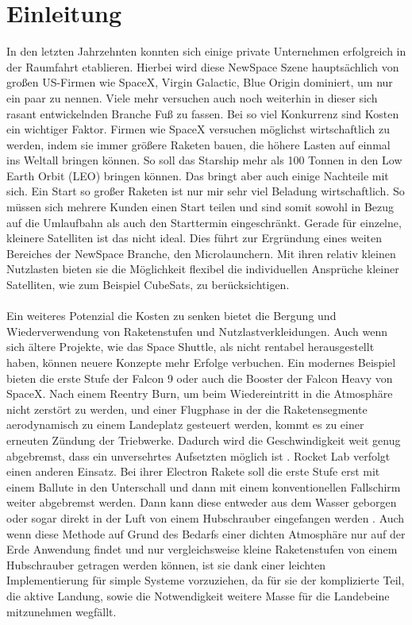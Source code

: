 \chapter{Einleitung}

In den letzten Jahrzehnten konnten sich einige private Unternehmen erfolgreich in der Raumfahrt etablieren. Hierbei wird diese NewSpace Szene hauptsächlich von großen US-Firmen wie SpaceX, Virgin Galactic, Blue Origin dominiert, um nur ein paar zu nennen. Viele mehr versuchen auch noch weiterhin in dieser sich rasant entwickelnden Branche Fuß zu fassen. Bei so viel Konkurrenz sind Kosten ein wichtiger Faktor. Firmen wie SpaceX versuchen möglichst wirtschaftlich zu werden, indem sie immer größere Raketen bauen, die höhere Lasten auf einmal ins Weltall bringen können. So soll das Starship mehr als 100 Tonnen in den Low Earth Orbit (LEO) \cite{starShipUserGuide} bringen können. Das bringt aber auch einige Nachteile mit sich. Ein Start so großer Raketen ist nur mir sehr viel Beladung wirtschaftlich. So müssen sich mehrere Kunden einen Start teilen und sind somit sowohl in Bezug auf die Umlaufbahn als auch den Starttermin eingeschränkt. Gerade für einzelne, kleinere Satelliten ist das nicht ideal. Dies führt zur Ergründung eines weiten Bereiches der NewSpace Branche, den Microlaunchern. Mit ihren relativ kleinen Nutzlasten bieten sie die Möglichkeit flexibel die individuellen Ansprüche kleiner Satelliten, wie zum Beispiel CubeSats, zu berücksichtigen.
\\~\\
Ein weiteres Potenzial die Kosten zu senken bietet die Bergung und Wiederverwendung von Raketenstufen und Nutzlastverkleidungen. Auch wenn sich ältere Projekte, wie das Space Shuttle, als nicht rentabel herausgestellt haben, können neuere Konzepte mehr Erfolge verbuchen. Ein modernes Beispiel bieten die erste Stufe der Falcon 9 oder auch die Booster der Falcon Heavy von SpaceX. Nach einem Reentry Burn, um beim Wiedereintritt in die Atmosphäre nicht zerstört zu werden, und einer Flugphase in der die Raketensegmente aerodynamisch zu einem Landeplatz gesteuert werden, kommt es zu einer erneuten Zündung der Triebwerke. Dadurch wird die Geschwindigkeit weit genug abgebremst, dass ein unversehrtes Aufsetzten möglich ist \cite{falconUserGuide}.
Rocket Lab verfolgt einen anderen Einsatz. Bei ihrer Electron Rakete soll die erste Stufe erst mit einem Ballute in den Unterschall und dann mit einem konventionellen Fallschirm weiter abgebremst werden. Dann kann diese entweder aus dem Wasser geborgen oder sogar direkt in der Luft von einem Hubschrauber eingefangen werden \cite{electronRocketLab}. Auch wenn diese Methode auf Grund des Bedarfs einer dichten Atmosphäre nur auf der Erde Anwendung findet und nur vergleichsweise kleine Raketenstufen von einem Hubschrauber getragen werden können, ist sie dank einer leichten Implementierung für simple Systeme vorzuziehen, da für sie der komplizierte Teil, die aktive Landung, sowie die Notwendigkeit weitere Masse für die Landebeine mitzunehmen wegfällt.
